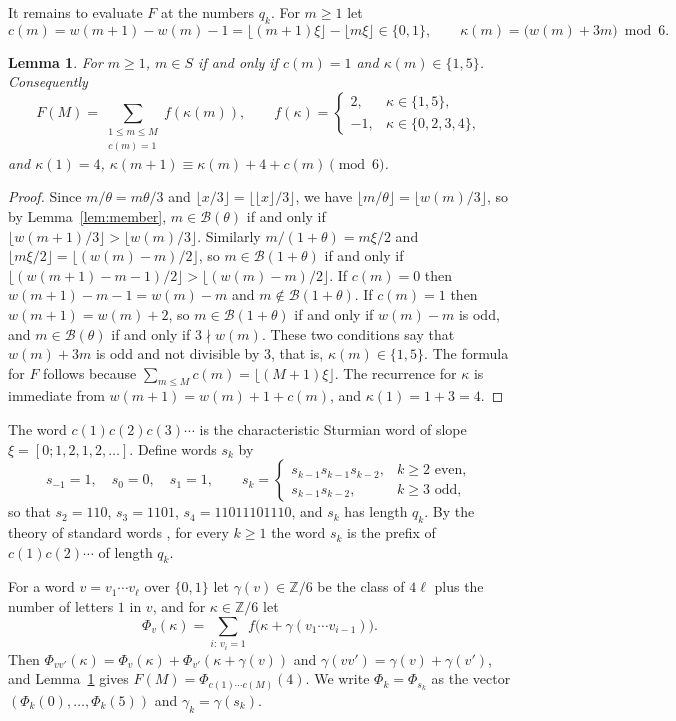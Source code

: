 \documentclass[12pt]{article}
\newcommand{\fl}[1]{\lfloor #1 \rfloor}
\newcommand{\B}{\mathcal{B}}
\newcommand{\Z}{\mathbb{Z}}
\theoremstyle{plain}
\newtheorem{lemma}[theorem]{Lemma}
\theoremstyle{remark}
\begin{document}
It remains to evaluate $F$ at the numbers $q_k$. For $m\ge1$ let
\[
c(m)=w(m+1)-w(m)-1=\fl{(m+1)\xi}-\fl{m\xi}\in\{0,1\},\qquad
\kappa(m)=\bigl(w(m)+3m\bigr)\bmod 6 .
\]

\begin{lemma}\label{lem:kappa}
For $m\ge1$, $m\in S$ if and only if $c(m)=1$ and $\kappa(m)\in\{1,5\}$. Consequently
\[
F(M)=\sum_{\substack{1\le m\le M\\ c(m)=1}} f(\kappa(m)),\qquad
f(\kappa)=\begin{cases}2,&\kappa\in\{1,5\},\\-1,&\kappa\in\{0,2,3,4\},\end{cases}
\]
and $\kappa(1)=4$, $\kappa(m+1)\equiv\kappa(m)+4+c(m)\pmod 6$.
\end{lemma}

\begin{proof}
Since $m/\theta=m\theta/3$ and $\fl{x/3}=\fl{\fl{x}/3}$, we have $\fl{m/\theta}=\fl{w(m)/3}$,
so by Lemma~\ref{lem:member}, $m\in\B(\theta)$ if and only if $\fl{w(m+1)/3}>\fl{w(m)/3}$.
Similarly $m/(1+\theta)=m\xi/2$ and $\fl{m\xi/2}=\fl{(w(m)-m)/2}$, so $m\in\B(1+\theta)$ if and
only if $\fl{(w(m+1)-m-1)/2}>\fl{(w(m)-m)/2}$. If $c(m)=0$ then $w(m+1)-m-1=w(m)-m$ and
$m\notin\B(1+\theta)$. If $c(m)=1$ then $w(m+1)=w(m)+2$, so $m\in\B(1+\theta)$ if and only if
$w(m)-m$ is odd, and $m\in\B(\theta)$ if and only if $3\nmid w(m)$. These two conditions say
that $w(m)+3m$ is odd and not divisible by $3$, that is, $\kappa(m)\in\{1,5\}$. The formula for
$F$ follows because $\sum_{m\le M}c(m)=\fl{(M+1)\xi}$. The recurrence for $\kappa$ is immediate
from $w(m+1)=w(m)+1+c(m)$, and $\kappa(1)=1+3=4$.
\end{proof}

The word $c(1)c(2)c(3)\cdots$ is the characteristic Sturmian word of slope
$\xi=[0;1,2,1,2,\dots]$. Define words $s_k$ by
\[
s_{-1}=1,\quad s_0=0,\quad s_1=1,\qquad
s_k=\begin{cases}s_{k-1}s_{k-1}s_{k-2},&k\ge2\text{ even},\\ s_{k-1}s_{k-2},&k\ge3\text{ odd},\end{cases}
\]
so that $s_2=110$, $s_3=1101$, $s_4=11011101110$, and $s_k$ has length $q_k$. By the theory of
standard words \cite[Section~2.2.2]{lothaire}, for every $k\ge1$ the word $s_k$ is the prefix
of
$c(1)c(2)\cdots$ of length $q_k$.

For a word $v=v_1\cdots v_\ell$ over $\{0,1\}$ let $\gamma(v)\in\Z/6$ be the class of $4\ell$
plus the number of letters $1$ in $v$, and for $\kappa\in\Z/6$ let
\[
\Phi_v(\kappa)=\sum_{i:\,v_i=1} f\bigl(\kappa+\gamma(v_1\cdots v_{i-1})\bigr).
\]
Then $\Phi_{vv'}(\kappa)=\Phi_v(\kappa)+\Phi_{v'}(\kappa+\gamma(v))$ and
$\gamma(vv')=\gamma(v)+\gamma(v')$, and Lemma~\ref{lem:kappa} gives
$F(M)=\Phi_{c(1)\cdots c(M)}(4)$. We write $\Phi_k=\Phi_{s_k}$ as the vector
$(\Phi_k(0),\dots,\Phi_k(5))$ and $\gamma_k=\gamma(s_k)$.
\end{document}
